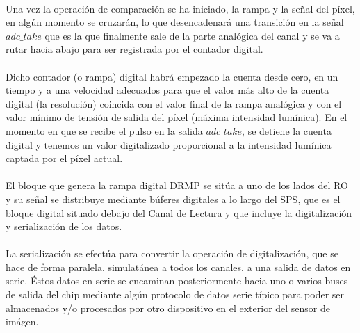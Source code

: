 \paragraph{}
Una vez la operación de comparación se ha iniciado, la rampa y la señal del píxel,
en algún momento se cruzarán, lo que desencadenará una transición en la señal
$adc\_take$ que es la que finalmente sale de la parte analógica del canal y se va
a rutar hacia abajo para ser registrada por el contador digital.

\paragraph{}
Dicho contador (o rampa) digital habrá empezado la cuenta desde cero, en un tiempo y a una
velocidad adecuados para que el valor más alto de la cuenta digital (la resolución)
coincida con el valor final de la rampa analógica y con el valor mínimo de tensión
de salida del píxel (máxima intensidad lumínica). En el momento en que se recibe
el pulso en la salida $adc\_take$, se detiene la cuenta digital y tenemos un valor
digitalizado proporcional a la intensidad lumínica captada por el píxel actual.

\paragraph{}
El bloque que genera la rampa digital DRMP se sitúa a uno de los lados del RO y
su señal se distribuye mediante búferes digitales a lo largo del SPS, que es
el bloque digital situado debajo del Canal de Lectura y que incluye la digitalización
y serialización de los datos.

\paragraph{}
La serialización se efectúa para convertir la operación de digitalización, que se
hace de forma paralela, simulatánea a todos los canales, a una salida de datos en serie.
Éstos datos en serie se encaminan posteriormente hacia uno o varios buses de salida
del chip mediante algún protocolo de datos serie típico para poder ser almacenados
y/o procesados por otro dispositivo en el exterior del sensor de imágen.
